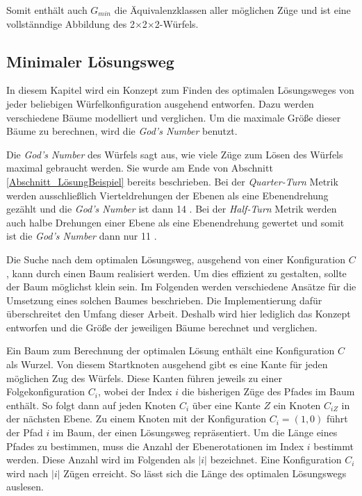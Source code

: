 \documentclass[12pt,a4paper, usenames, dvipsnames]{article}
\theoremstyle{mystyle}
\theoremstyle{definition}
\newcommand{\Ttwo}{2$\times$2$\times$2-}
\begin{document}
Somit enthält auch $G_{min}$ die Äquivalenzklassen aller möglichen Züge und ist eine vollstänndige Abbildung des \Ttwo Würfels.

%
%
%
%
%
%
%
%
%
%
%
%
%
%
%
%
%
%
\subsection{Minimaler Lösungsweg}

\label{Abschnitt_MinLösung}

In diesem Kapitel wird ein Konzept zum Finden des optimalen Lösungsweges von jeder beliebigen Würfelkonfiguration ausgehend entworfen. Dazu werden verschiedene Bäume modelliert und verglichen. Um die maximale Größe dieser Bäume zu berechnen, wird die \textit{God's Number} benutzt. 

Die \textit{God's Number} des Würfels sagt aus, wie viele Züge zum Lösen des Würfels maximal gebraucht werden. Sie wurde am Ende von Abschnitt \ref{Abschnitt_LösungBeispiel} bereits beschrieben. Bei der \textit{Quarter-Turn} Metrik werden ausschließlich Vierteldrehungen der Ebenen als eine Ebenendrehung gezählt und die \textit{God's Number} ist dann 14 \cite{DJ}. Bei der \textit{Half-Turn} Metrik werden auch halbe Drehungen einer Ebene als eine Ebenendrehung gewertet und somit ist die \textit{God's Number} dann nur 11 \cite{RMG}.

Die Suche nach dem optimalen Lösungsweg, ausgehend von einer Konfiguration $C$, kann durch einen Baum realisiert werden. Um dies effizient zu gestalten, sollte der Baum möglichst klein sein. Im Folgenden werden verschiedene Ansätze für die Umsetzung eines solchen Baumes beschrieben. Die Implementierung dafür überschreitet den Umfang dieser Arbeit. Deshalb wird hier lediglich das Konzept entworfen und die Größe der jeweiligen Bäume berechnet und verglichen. 

Ein Baum zum Berechnung der optimalen Lösung enthält eine Konfiguration $C$ als Wurzel. Von diesem Startknoten ausgehend gibt es eine Kante für jeden möglichen Zug des Würfels. Diese Kanten führen jeweils zu einer Folgekonfiguration $C_i$, wobei der Index $i$ die bisherigen Züge des Pfades im Baum enthält. So folgt dann auf jeden Knoten $C_i$ über eine Kante $Z$ ein Knoten $C_{iZ}$ in der nächsten Ebene. Zu einem Knoten mit der Konfiguration $C_i=(1,0)$ führt der Pfad $i$ im Baum, der einen Lösungsweg repräsentiert. Um die Länge eines Pfades zu bestimmen, muss die Anzahl der Ebenerotationen im Index $i$ bestimmt werden. Diese Anzahl wird im Folgenden als $|i|$ bezeichnet. Eine Konfiguration $C_i$ wird nach $|i|$ Zügen erreicht. So lässt sich die Länge des optimalen Lösungswegs auslesen.
\end{document}
